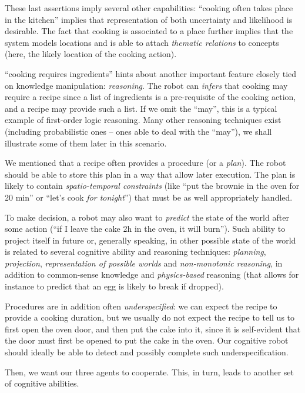These last assertions imply several other capabilities: ``cooking often takes
place in the kitchen'' implies that representation of both uncertainty and
likelihood is desirable. The fact that cooking is associated to a place further
implies that the system models locations and is able to attach \emph{thematic
relations} to concepts (here, the likely location of the cooking action).

``cooking requires ingredients'' hints about another important feature closely
tied on knowledge manipulation: \emph{reasoning}. The robot can \emph{infers}
that cooking may require a recipe since a list of ingredients is a
pre-requisite of the cooking action, and a recipe may provide such a list.  If
we omit the ``may'', this is a typical example of first-order logic reasoning.
Many other reasoning techniques exist (including probabilistic ones -- ones
able to deal with the ``may''), we shall illustrate some of them later in this
scenario.

We mentioned that a recipe often provides a procedure (or a \emph{plan}). The
robot should be able to store this plan in a way that allow later execution.
The plan is likely to contain \emph{spatio-temporal constraints} (like ``put
the brownie in the oven for 20 min'' or ``let's cook \emph{for tonight}'') that
must be as well appropriately handled.

To make decision, a robot may also want to \emph{predict} the state of the
world after some action (``if I leave the cake 2h in the oven, it will burn'').
Such ability to project itself in future or, generally speaking, in other
possible state of the world is related to several cognitive ability and
reasoning techniques: \emph{planning}, \emph{projection}, \emph{representation
of possible worlds} and \emph{non-monotonic reasoning}, in addition to
common-sense knowledge and \emph{physics-based} reasoning (that allows for
instance to predict that an egg is likely to break if dropped).

Procedures are in addition often \emph{underspecified}: we can expect the
recipe to provide a cooking duration, but we usually do not expect the recipe
to tell us to first open the oven door, and then put the cake into it, since it
is self-evident that the door must first be opened to put the cake in the oven.
Our cognitive robot should ideally be able to detect and possibly complete such
underspecification.

Then, we want our three agents to cooperate. This, in turn, leads to another
set of cognitive abilities.


